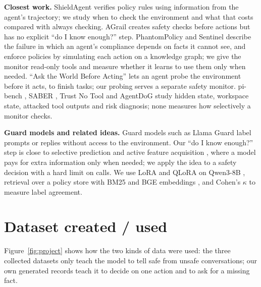 \documentclass[10pt]{article}
\begin{document}
\textbf{Closest work.} ShieldAgent \citep{chen2025shieldagent} verifies policy rules using information from
the agent's trajectory; we study when to check the environment and what that costs compared with always
checking. AGrail \citep{luo2025agrail} creates safety checks before actions but has no explicit ``do I know
enough?'' step. PhantomPolicy and Sentinel \citep{wu2026phantompolicy} describe the failure in which an
agent's compliance depends on facts it cannot see, and enforce policies by simulating each action on a
knowledge graph; we give the monitor read-only tools and measure whether it learns to use them only when
needed. ``Ask the World Before Acting'' \citep{song2026askworld} lets an agent probe the environment before
it acts, to finish tasks; our probing serves a separate safety monitor. pi-bench \citep{das2026pibench},
SABER \citep{hu2026saber}, Trust No Tool \citep{yan2026trustnotool} and AgentDoG \citep{liu2026agentdog}
study hidden state, workspace state, attacked tool outputs and risk diagnosis; none measures how selectively
a monitor checks.

\textbf{Guard models and related ideas.} Guard models such as Llama Guard \citep{inan2023llamaguard} label
prompts or replies without access to the environment. Our ``do I know enough?'' step is close to selective
prediction \citep{geifman2017selective} and active feature acquisition \citep{shim2018afa}, where a model pays
for extra information only when needed; we apply the idea to a safety decision with a hard limit on calls. We
use LoRA \citep{hu2022lora} and QLoRA \citep{dettmers2023qlora} on Qwen3-8B \citep{qwen2025qwen3}, retrieval
over a policy store \citep{lewis2020rag} with BM25 \citep{robertson2009bm25} and BGE embeddings
\citep{xiao2023cpack}, and Cohen's $\kappa$ \citep{cohen1960} to measure label agreement.

\section{Dataset created / used}\label{sec:data}
Figure~\ref{fig:project} shows how the two kinds of data were used: the three collected datasets only teach
the model to tell safe from unsafe conversations; our own generated records teach it to decide on one action
and to ask for a missing fact.
\end{document}
